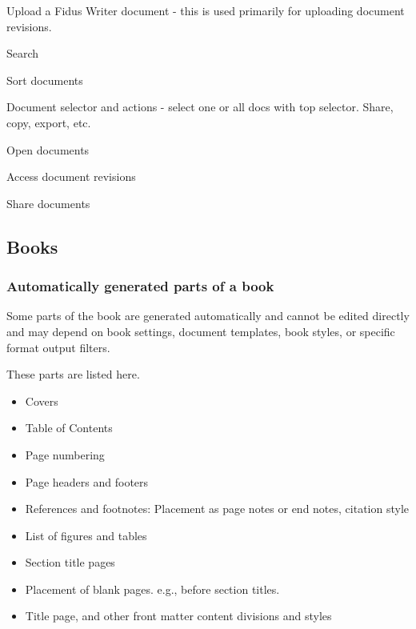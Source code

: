 \documentclass{article}
\begin{document}
Upload a Fidus Writer document - this is used primarily for uploading document revisions.


Search


Sort documents


Document selector and actions - select one or all docs with top selector. Share, copy, export, etc. 


Open documents


Access document revisions


Share documents


\subsection{Books}\label{H6665750}



\subsubsection{Automatically generated parts of a book}\label{H7619734}



Some parts of the book are generated automatically and cannot be edited directly and may depend on book settings, document templates, book styles, or specific format output filters. 


These parts are listed here.

\begin{itemize}
\item Covers


\item Table of Contents


\item Page numbering


\item Page headers and footers


\item References and footnotes: Placement as page notes or end notes, citation style


\item List of figures and tables


\item Section title pages


\item Placement of blank pages. e.g., before section titles.


\item Title page, and other front matter content divisions and styles


\end{itemize}
\end{document}
